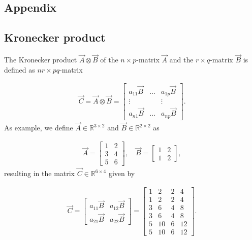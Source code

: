 \begin{appendices}
	
\chapter{Appendix} 
\section{Kronecker product} \label{apx:AppendixKronecker}

The Kronecker product $\vec{A} \otimes \vec{B}$ of the $n \times p$-matrix $\vec{A}$ and the $r \times q$-matrix $\vec{B}$ is defined as $nr \times pq$-matrix 

\begin{align}
	\vec{C} = \vec{A} \otimes \vec{B} = 
		\begin{bmatrix}
			a_{11} \vec{B} & \dots & a_{1p} \vec{B} \\
			\vdots 	       &       &  \vdots \\
			a_{n1} \vec{B} & \dots & a_{np} \vec{B}     
		\end{bmatrix}. 
\end{align}
%
As example, we define $\vec{A} \in \mathbb{R}^{3 \times 2}$ and $\vec{B} \in \mathbb{R}^{2 \times 2}$ as

\begin{align}
	\vec{A} = \begin{bmatrix}
			1 & 2  \\
			3 & 4 \\
			5 & 6		
		\end{bmatrix}, \quad 
	\vec{B} = 
		\begin{bmatrix}
			1 & 2  \\
			1 & 2   
		\end{bmatrix},
\end{align}
%
resulting in the matrix $\vec{C} \in \mathbb{R}^{6 \times 4}$ given by

\begin{align}
	\vec{C} = 
	\begin{bmatrix}
		a_{11} \vec{B} &  a_{12} \vec{B} \\
		a_{21} \vec{B} &  a_{22} \vec{B}
	\end{bmatrix} = 
	\begin{bmatrix}
		1 & 2 & 2 & 4  \\
		1 & 2 & 2 & 4 \\
		3 & 6 & 4 & 8 \\
		3 & 6 & 4 & 8 \\
		5 & 10& 6 &12 \\
		5 & 10& 6 &12
	\end{bmatrix}.
\end{align}


\end{appendices}
